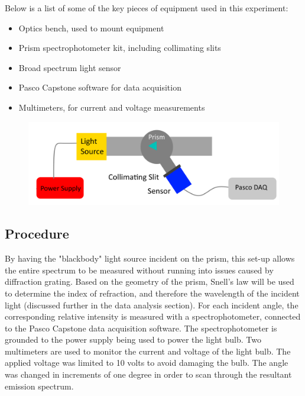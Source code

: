 \documentclass[a4paper]{article}
\begin{document}
Below is a list of some of the key pieces of equipment used in this experiment:

\begin{itemize}
\item Optics bench, used to mount equipment
\item Prism spectrophotometer kit, including collimating slits
\item Broad spectrum light sensor
\item Pasco Capstone software for data acquisition
\item Multimeters, for current and voltage measurements
\end{itemize}

\begin{figure}[H]
\centering
\includegraphics[width=\textwidth]{blackbody_circuit.png}
\label{blackbody_circuit}
\end{figure}

\subsection{Procedure}

\qq By having the "blackbody" light source incident on the prism, this set-up allows the entire spectrum to be measured without running into issues caused by diffraction grating. Based on the geometry of the prism, Snell's law will be used to determine the index of refraction, and therefore the wavelength of the incident light (discussed further in the data analysis section). For each incident angle, the corresponding relative intensity is measured with a spectrophotometer, connected to the Pasco Capstone data acquisition software. The spectrophotometer is grounded to the power supply being used to power the light bulb. Two multimeters are used to monitor the current and voltage of the light bulb. The applied voltage was limited to 10 volts to avoid damaging the bulb. The angle was changed in increments of one degree in order to scan through the resultant emission spectrum.
\end{document}
